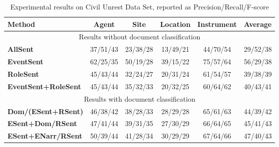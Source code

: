 \begin{table}[ht]

\footnotesize

\centering

\begin{tabular}[center]{|p{1.4in}|cccc|c|} \hline



{\bf Method} & {\bf Agent} & {\bf Site} & {\bf Location} & {\bf Instrument}  & {\bf Average} \\ \hline

\multicolumn{6}{|c|}{Results without document classification} \\ \hline

{\bf AllSent} & 37/51/43 & 23/38/28 & 13/49/21 &	44/70/54 & 29/52/38 \\

{\bf EventSent} & 62/25/35 & 50/19/28 & 39/15/22 & 75/57/64 & 56/29/38 \\

{\bf RoleSent} & 45/43/44 & 32/24/27 & 20/31/24 & 61/54/57 & 39/38/39 \\

{\bf EventSent+RoleSent} & 45/43/44 & 35/32/33 & 20/32/25 & 60/64/62 & 40/43/41 \\ \hline

\multicolumn{6}{|c|}{Results with document classification} \\ \hline

{\bf Dom/(ESent+RSent)} & 46/38/42 & 38/28/33 & 28/29/28 & 65/61/63 & 44/39/42 \\

{\bf ESent+Dom/RSent} & 47/41/44 & 39/31/35 & 27/30/29 & 66/64/65 & 45/41/43 \\


{\bf ESent+ENarr/RSent} & 50/39/44 & 41/28/34 & 30/29/29 & 67/64/66 & 47/40/43 \\ \hline




\end{tabular}

\caption{Experimental results on Civil Unrest Data Set, reported as Precision/Recall/F-score}

\label{results-table-cu}

\end{table}

